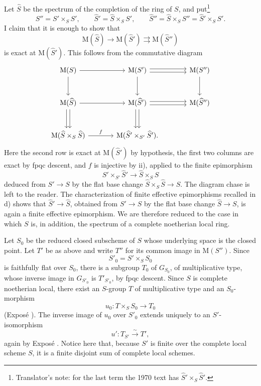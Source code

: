 Let \(\widehat S\) be the spectrum of the completion of the ring of
\(S\), and put\footnote{Translator's note: for the last term the 1970
text has \(\widehat S'\times_S\widehat S'\).}
\[
  S''=S'\times_S S',
  \qquad
  \widehat S'=\widehat S\times_S S',
  \qquad
  \widehat S''=\widehat S\times_S S''
      =\widehat S'\times_S S'.
\]
I claim that it is enough to show that
\[
  \tag{\(\widehat *\)}\label{sga3:xv:lemma:3-9:equation:widehat-star}
  \mathrm M(\widehat S)\longrightarrow
  \mathrm M(\widehat S')
  \rightrightarrows
  \mathrm M(\widehat S'')
\]
is exact at \(\mathrm M(\widehat S')\). This follows from the
commutative diagram
\[
\begin{tikzcd}[column sep=large,row sep=large]
\mathrm M(S) \arrow[r] \arrow[d]
  & \mathrm M(S') \arrow[r,shift left=.55ex]
      \arrow[r,shift right=.55ex] \arrow[d]
  & \mathrm M(S'') \arrow[d]\\
\mathrm M(\widehat S) \arrow[r]
      \arrow[d,shift left=.55ex] \arrow[d,shift right=.55ex]
  & \mathrm M(\widehat S') \arrow[r,shift left=.55ex]
      \arrow[r,shift right=.55ex]
      \arrow[d,shift left=.55ex] \arrow[d,shift right=.55ex]
  & \mathrm M(\widehat S'')\\
\mathrm M(\widehat S\times_S\widehat S)
  \arrow[r,"f"]
  & \mathrm M(\widehat S'\times_{S'}\widehat S').
\end{tikzcd}
\]
Here the second row is exact at \(\mathrm M(\widehat S')\) by
hypothesis, the first two columns are exact by fpqc descent, and
\(f\) is injective by ii), applied to the finite epimorphism
\[
  \widehat S'\times_{S'}\widehat S'
  \longrightarrow
  \widehat S\times_S\widehat S
\]
deduced from \(S'\to S\) by the flat base change
\(\widehat S\times_S\widehat S\to S\). The diagram chase is left
to the reader. The characterization of finite effective
epimorphisms recalled in d) shows that
\(\widehat S'\to\widehat S\), obtained from \(S'\to S\) by the
flat base change \(\widehat S\to S\), is again a finite effective
epimorphism. We are therefore reduced to the case in which \(S\)
is, in addition, the spectrum of a complete noetherian local ring.

Let \(S_0\) be the reduced closed subscheme of \(S\) whose
underlying space is the closed point. Let \(T'\) be as above and
write \(T''\) for its common image in \(\mathrm M(S'')\). Since
\[
  S'_0=S'\times_S S_0
\]
is faithfully flat over \(S_0\), there is a subgroup \(T_0\) of
\(G_{S_0}\), of multiplicative type, whose inverse image in
\(G_{S'_0}\) is \(T'_{S'_0}\), by fpqc descent. Since \(S\) is
complete noetherian local, there exist an \(S\)-group \(T\) of
multiplicative type and an \(S_0\)-morphism
\[
  u_0:T\times_S S_0\longrightarrow T_0
\]
(Exposé ). The inverse image of \(u_0\) over \(S'_0\) extends
uniquely to an \(S'\)-isomorphism
\[
  u':T_{S'}\xrightarrow{\sim}T',
\]
again by Exposé . Notice here that, because \(S'\) is finite
over the complete local scheme \(S\), it is a finite disjoint sum
of complete local schemes.

